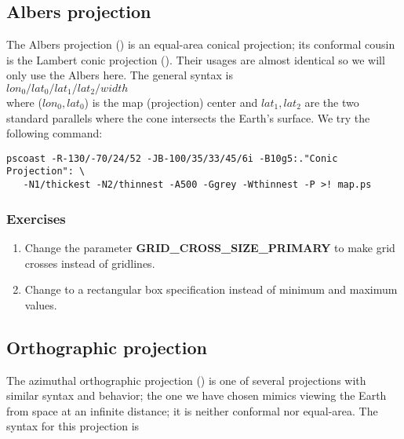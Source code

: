 \documentclass{report}
\begin{document}
\subsection{Albers projection}

The Albers projection () is an equal-area conical projection;
its conformal cousin is the Lambert conic projection ().
Their usages are almost identical so we will only use the Albers here.
The general syntax is \\

$lon_0/lat_0/lat_1/lat_2/width$ \\

\noindent
where ($lon_0, lat_0$) is the map (projection) center and $lat_1, lat_2$
are the two standard parallels where the cone intersects the Earth's surface.
We try the following command:

\begin{verbatim}
pscoast -R-130/-70/24/52 -JB-100/35/33/45/6i -B10g5:."Conic Projection": \
   -N1/thickest -N2/thinnest -A500 -Ggrey -Wthinnest -P >! map.ps
\end{verbatim}

\subsubsection{Exercises}

\begin{enumerate}

\item Change the parameter {\bf GRID\_CROSS\_SIZE\_PRIMARY} to make grid crosses instead of gridlines.

\item Change  to a rectangular box specification instead of
minimum and maximum values.

\end{enumerate}

\subsection{Orthographic projection}

The azimuthal orthographic projection () is one of several
projections with similar syntax and behavior; the one we have
chosen mimics viewing the Earth from space at an infinite distance;
it is neither conformal nor equal-area.
The syntax for this projection is \\
\end{document}
